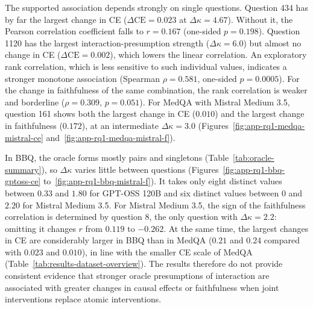 The supported association depends strongly on single questions. Question 434 has by far the largest change in CE ($\Delta\mathrm{CE}=0.023$ at $\Delta\kappa=4.67$). Without it, the Pearson correlation coefficient falls to $r=0.167$ (one-sided $p=0.198$). Question 1120 has the largest interaction-presumption strength ($\Delta\kappa=6.0$) but almost no change in CE ($\Delta\mathrm{CE}=0.002$), which lowers the linear correlation. An exploratory rank correlation, which is less sensitive to such individual values, indicates a stronger monotone association (Spearman $\rho=0.581$, one-sided $p=0.0005$). For the change in faithfulness of the same combination, the rank correlation is weaker and borderline ($\rho=0.309$, $p=0.051$). For MedQA with Mistral Medium 3.5, question 161 shows both the largest change in CE ($0.010$) and the largest change in faithfulness ($0.172$), at an intermediate $\Delta\kappa=3.0$ (Figures~\ref{fig:app-rq1-medqa-mistral-ce} and~\ref{fig:app-rq1-medqa-mistral-f}).

In BBQ, the oracle forms mostly pairs and singletons (Table~\ref{tab:oracle-summary}), so $\Delta\kappa$ varies little between questions (Figures~\ref{fig:app-rq1-bbq-gptoss-ce} to~\ref{fig:app-rq1-bbq-mistral-f}). It takes only eight distinct values between $0.33$ and $1.80$ for GPT-OSS 120B and six distinct values between $0$ and $2.20$ for Mistral Medium 3.5. For Mistral Medium 3.5, the sign of the faithfulness correlation is determined by question 8, the only question with $\Delta\kappa=2.2$: omitting it changes $r$ from $0.119$ to $-0.262$. At the same time, the largest changes in CE are considerably larger in BBQ than in MedQA ($0.21$ and $0.24$ compared with $0.023$ and $0.010$), in line with the smaller CE scale of MedQA (Table~\ref{tab:results-dataset-overview}). The results therefore do not provide consistent evidence that stronger oracle presumptions of interaction are associated with greater changes in causal effects or faithfulness when joint interventions replace atomic interventions.

